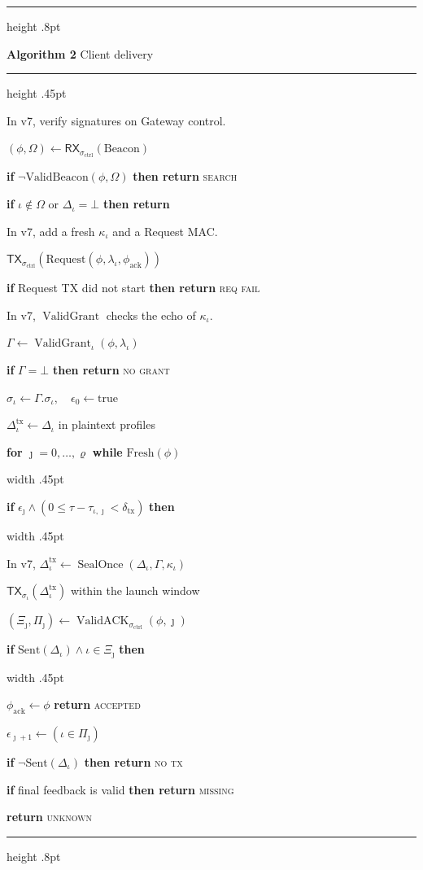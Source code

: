 \documentclass[11pt,multi=algorithm,border=6pt]{standalone}
\newenvironment{algorithm}[2]{%
  \begin{minipage}{252pt}
  \raggedright
  \setlength{\parindent}{0pt}%
  \setlength{\parskip}{2pt}%
  \hrule height .8pt\vspace{4pt}%
  {\large\textbf{Algorithm #1} \enspace #2\par}%
  \vspace{3pt}\hrule height .45pt\vspace{5pt}%
}{\par\vspace{5pt}\hrule height .8pt\end{minipage}}
\newcommand{\Step}[1]{\noindent #1\par}
\DeclareMathOperator{\ValidGrant}{ValidGrant}
\DeclareMathOperator{\ValidACK}{ValidACK}
\DeclareMathOperator{\Seal}{SealOnce}
\newcommand{\ctrl}{\sigma_{\mathrm{ctrl}}}
\newcommand{\Tx}[2]{\mathsf{TX}_{#1}(#2)}
\newcommand{\Rx}[2]{\mathsf{RX}_{#1}(#2)}
\newcommand{\Block}[2]{%
  \Step{#1}%
  \noindent\hspace{.75em}\vrule width .45pt\hspace{.65em}%
  \begin{minipage}[t]{\dimexpr\linewidth-1.4em-.45pt\relax}%
    \raggedright\setlength{\parskip}{2pt}#2%
  \end{minipage}\par%
}
\begin{document}
\begin{algorithm}{2}{Client delivery}
  \Step{In v7, verify signatures on Gateway control.}
  \Step{$(\phi,\Omega)\gets\Rx{\ctrl}{\mathrm{Beacon}}$}
  \Step{\textbf{if} $\neg\mathrm{ValidBeacon}(\phi,\Omega)$ \textbf{then return} \textsc{search}}
  \Step{\textbf{if} $\iota\notin\Omega$ or $\Delta_\iota=\bot$ \textbf{then return}}
  \Step{In v7, add a fresh $\kappa_\iota$ and a Request MAC.}
  \Step{$\Tx{\ctrl}{\mathrm{Request}(\phi,\lambda_\iota,\phi_{\mathrm{ack}})}$}
  \Step{\textbf{if} Request TX did not start \textbf{then return} \textsc{req fail}}
  \Step{In v7, $\ValidGrant$ checks the echo of $\kappa_\iota$.}
  \Step{$\Gamma\gets\ValidGrant_\iota(\phi,\lambda_\iota)$}
  \Step{\textbf{if} $\Gamma=\bot$ \textbf{then return} \textsc{no grant}}
  \Step{$\sigma_\iota\gets\Gamma.\sigma_\iota,\quad \epsilon_0\gets\mathrm{true}$}
  \Step{$\Delta_\iota^{\mathrm{tx}}\gets\Delta_\iota$ in plaintext profiles}
  \Block{\textbf{for} $\jmath=0,\ldots,\varrho$ \textbf{while} $\mathrm{Fresh}(\phi)$}{%
    \Block{\textbf{if} $\epsilon_\jmath\land(0\le\tau-\tau_{\iota,\jmath}<\delta_{\mathrm{tx}})$ \textbf{then}}{%
      \Step{In v7, $\Delta_\iota^{\mathrm{tx}}\gets\Seal(\Delta_\iota,\Gamma,\kappa_\iota)$}%
      \Step{$\Tx{\sigma_\iota}{\Delta_\iota^{\mathrm{tx}}}$ within the launch window}%
    }
    \Step{$(\Xi_\jmath,\Pi_\jmath)\gets\ValidACK_{\ctrl}(\phi,\jmath)$}
    \Block{\textbf{if} $\mathrm{Sent}(\Delta_\iota)\land\iota\in\Xi_\jmath$ \textbf{then}}{%
      \Step{$\phi_{\mathrm{ack}}\gets\phi$ \enspace\textbf{return} \textsc{accepted}}%
    }
    \Step{$\epsilon_{\jmath+1}\gets(\iota\in\Pi_\jmath)$}%
  }
  \Step{\textbf{if} $\neg\mathrm{Sent}(\Delta_\iota)$ \textbf{then return} \textsc{no tx}}
  \Step{\textbf{if} final feedback is valid \textbf{then return} \textsc{missing}}
  \Step{\textbf{return} \textsc{unknown}}
\end{algorithm}
\end{document}
